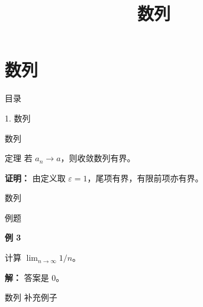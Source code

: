 \documentclass[aspectratio=169,10pt,fontset=fandol]{ctexbeamer}
\title{数列}
\begin{document}
\section{数列}
\begin{frame}[t,fragile]{目录}
\normalsize
{\color{blue}\normalsize 1. 数列\par}\vspace{0.22em}
\end{frame}
\begin{frame}[t,fragile]{数列}
\normalsize
\begin{block}{定理}
{\normalsize
若 $a_n\to a$，则收敛数列有界。
}
\end{block}
\pause
{\normalsize
\textbf{证明：}
由定义取 $\varepsilon=1$，尾项有界，有限前项亦有界。
}
\end{frame}
\begin{frame}[t,fragile]{数列}
\normalsize
\begin{block}{例题}
{\normalsize
\textbf{例 3}\par
计算 $\lim_{n\to\infty}1/n$。
}
\end{block}
\pause
{\normalsize
\textbf{解：}
答案是 $0$。
}
\end{frame}
\begin{frame}[t,fragile]{数列}
\normalsize
\normalsize
补充例子
\end{frame}
\end{document}
